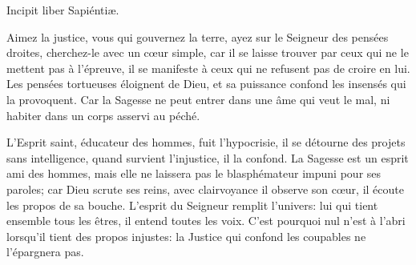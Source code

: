





Incipit liber Sapiéntiæ.

Aimez la justice, vous qui gouvernez la terre,
	ayez sur le Seigneur des pensées droites, cherchez-le avec un cœur simple,
	car il se laisse trouver par ceux qui ne le mettent pas à l’épreuve,
	il se manifeste à ceux qui ne refusent pas de croire en lui.
Les pensées tortueuses éloignent de Dieu,
	et sa puissance confond les insensés qui la provoquent.
Car la Sagesse ne peut entrer dans une âme qui veut le mal,
	ni habiter dans un corps asservi au péché.


L’Esprit saint, éducateur des hommes, fuit l’hypocrisie,
	il se détourne des projets sans intelligence,
	quand survient l’injustice, il la confond.
La Sagesse est un esprit ami des hommes,
	mais elle ne laissera pas le blasphémateur impuni pour ses paroles;
	car Dieu scrute ses reins, avec clairvoyance il observe son cœur,
	il écoute les propos de sa bouche.
L’esprit du Seigneur remplit l’univers:
	lui qui tient ensemble tous les êtres, il entend toutes les voix.
C’est pourquoi nul n’est à l’abri lorsqu’il tient des propos injustes:
	la Justice qui confond les coupables ne l’épargnera pas.


